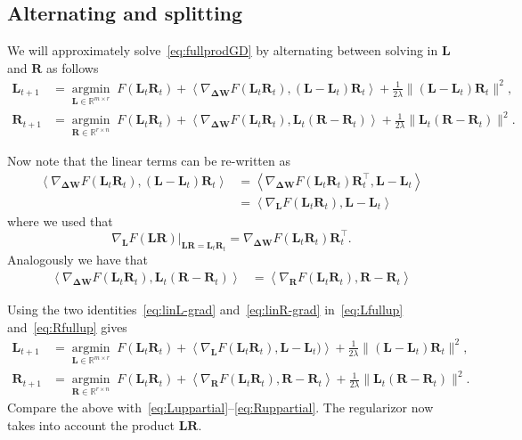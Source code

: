 \documentclass[11pt]{article}
\newcommand{\mat}[1]{\bm{#1}}
\newcommand{\R}{\mathbb{R}}
\newcommand{\mL}{\mat{L}}
\newcommand{\mR}{\mat{R}}
\newcommand{\DW}{\mat{\Delta W}}
\newcommand{\dotprod}[1]{\left< #1\right>}
\DeclareMathOperator{\argmininn}{argmin}
\newcommand{\argmin}[1]{ \underset{#1}{\argmininn} \;}
\begin{document}
\subsection{Alternating and splitting}

We will approximately solve~\eqref{eq:fullprodGD} by alternating between solving in $\mL$ and $\mR$ as follows
\begin{align}
 \mL_{t+1} &=   \argmin{\mL \in \R^{m \times r}} F(\mL_t\mR_t) + \dotprod{\nabla_{\DW} F(\mL_t\mR_t), (\mL-\mL_t)\mR_t } + \frac{1}{2\lambda} \|(\mL-\mL_t)\mR_t\|^2, \label{eq:Lfullup} \\
  \mR_{t+1}&=   \argmin{\mR \in \R^{r \times n}} F(\mL_t\mR_t) + \dotprod{\nabla_{\DW} F(\mL_t\mR_t), \mL_t(\mR-\mR_t) } + \frac{1}{2\lambda} \|\mL_t(\mR-\mR_t)\|^2.\label{eq:Rfullup}
\end{align}

Now note that the linear terms can be re-written as
\begin{align} \label{eq:linL-grad}
   \dotprod{\nabla_{\DW} F(\mL_t\mR_t), (\mL-\mL_t)\mR_t } & = \dotprod{\nabla_{\DW} F(\mL_t\mR_t)\mR_t^\top, \mL-\mL_t }  \nonumber \\
   &=\dotprod{\nabla_{\mL} F(\mL_t\mR_t), \mL-\mL_t }
\end{align}
where we used that
\[  \nabla_{\mL} F(\mL \mR) \Big|_{\mL \mR= \mL_t \mR_t} = \nabla_{\DW} F(\mL_t\mR_t)\mR_t^\top. \]
Analogously we have that
\begin{align}\label{eq:linR-grad}
   \dotprod{\nabla_{\DW} F(\mL_t\mR_t),\mL_t(\mR-\mR_t)} 
   &=\dotprod{\nabla_{\mR} F(\mL_t\mR_t), \mR-\mR_t }
\end{align}

Using the two identities~\eqref{eq:linL-grad} and~\eqref{eq:linR-grad} in~\eqref{eq:Lfullup} and~\eqref{eq:Rfullup} gives
\begin{align}
 \mL_{t+1} &=   \argmin{\mL \in \R^{m \times r}} F(\mL_t\mR_t) + \dotprod{\nabla_{\mL} F(\mL_t\mR_t), \mL-\mL_t) } + \frac{1}{2\lambda} \|(\mL-\mL_t)\mR_t\|^2, \label{eq:Lfullupsub} \\
  \mR_{t+1}&=   \argmin{\mR \in \R^{r \times n}} F(\mL_t\mR_t) + \dotprod{\nabla_{\mR} F(\mL_t\mR_t), \mR-\mR_t } + \frac{1}{2\lambda} \|\mL_t(\mR-\mR_t)\|^2.\label{eq:Rfullupsub}
\end{align}
Compare the above with~\eqref{eq:Luppartial}--\eqref{eq:Ruppartial}. The regularizor now takes into account the product $\mL\mR$. 
\end{document}
